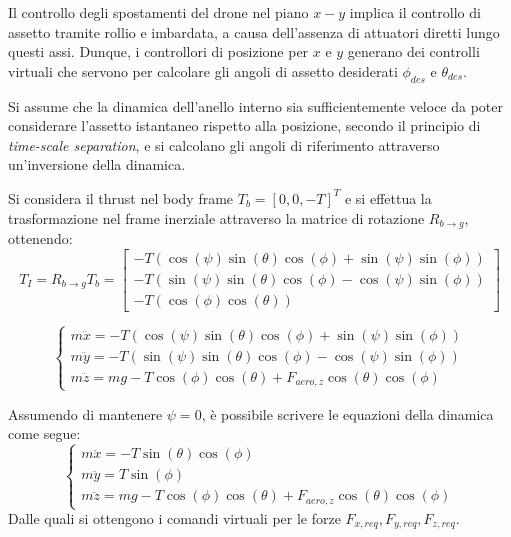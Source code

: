 Il controllo degli spostamenti del drone nel piano $x-y$ implica il controllo di assetto tramite rollio e imbardata, a causa dell'assenza di attuatori diretti lungo questi assi.
Dunque, i controllori di posizione per $x$ e $y$ generano dei controlli virtuali che servono per calcolare gli angoli di assetto desiderati $\phi_{des}$ e $\theta_{des}$.

Si assume che la dinamica dell'anello interno sia sufficientemente veloce da poter considerare l'assetto istantaneo rispetto alla posizione, secondo il principio di \textit{time-scale separation}, e si calcolano gli angoli di riferimento
attraverso un'inversione della dinamica.

Si considera il thrust nel body frame $T_b = [0, 0, -T]^T$ e si effettua la trasformazione nel frame inerziale attraverso la matrice di rotazione $R_{b \to g}$, ottenendo:
\begin{equation}
    T_I = R_{b \to g} T_b = 
    \begin{bmatrix}
        -T(\cos(\psi)\sin(\theta)\cos(\phi) + \sin(\psi)\sin(\phi))\\
        -T(\sin(\psi)\sin(\theta)\cos(\phi) - \cos(\psi)\sin(\phi))\\
        -T(\cos(\phi)\cos(\theta))
    \end{bmatrix}
\end{equation}

\begin{equation}
    \begin{cases}
        m \ddot{x} = -T(\cos(\psi)\sin(\theta)\cos(\phi) + \sin(\psi)\sin(\phi))\\
        m \ddot{y} = -T(\sin(\psi)\sin(\theta)\cos(\phi) - \cos(\psi)\sin(\phi))\\
        m \ddot{z} = m g -T\cos(\phi)\cos(\theta) + F_{aero,z}\cos(\theta)\cos(\phi)
    \end{cases}
\end{equation}

Assumendo di mantenere $\psi = 0$, è possibile scrivere le equazioni della dinamica come segue:
\begin{equation}
    \begin{cases}
        m \ddot{x} = -T\sin(\theta)\cos(\phi)\\
        m \ddot{y} = T\sin(\phi)\\
        m \ddot{z} = m g -T\cos(\phi)\cos(\theta) + F_{aero,z}\cos(\theta)\cos(\phi)
    \end{cases}
\end{equation}
Dalle quali si ottengono i comandi virtuali per le forze $F_{x,req}, F_{y,req}, F_{z,req}$.

